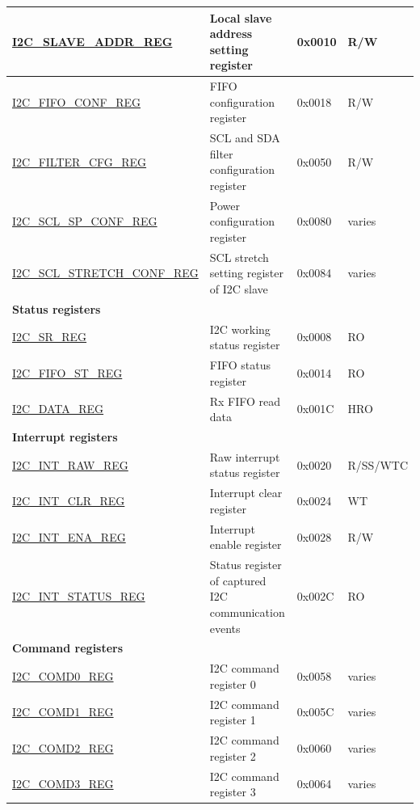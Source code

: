 \begin{longtable}{ | p{6cm} | p{7cm} | p{1.3cm} | p{1cm} | }
\hyperref[regdesc:I2CSLAVEADDRREG]{I2C\_SLAVE\_ADDR\_REG} & Local slave address setting register & 0x0010 & R/W \\ \hline
\hyperref[regdesc:I2CFIFOCONFREG]{I2C\_FIFO\_CONF\_REG} & FIFO configuration register & 0x0018 & R/W \\ \hline
\hyperref[regdesc:I2CFILTERCFGREG]{I2C\_FILTER\_CFG\_REG} & SCL and SDA filter configuration register & 0x0050 & R/W \\ \hline
\hyperref[regdesc:I2CSCLSPCONFREG]{I2C\_SCL\_SP\_CONF\_REG} & Power configuration register & 0x0080 & varies \\ \hline
\hyperref[regdesc:I2CSCLSTRETCHCONFREG]{I2C\_SCL\_STRETCH\_CONF\_REG} & SCL stretch setting register of I2C slave & 0x0084 & varies \\ \hline
\multicolumn{4}{|l|}{\textbf{Status registers}} \\ \hline
\hyperref[regdesc:I2CSRREG]{I2C\_SR\_REG} & I2C working status register & 0x0008 & RO \\ \hline
\hyperref[regdesc:I2CFIFOSTREG]{I2C\_FIFO\_ST\_REG} & FIFO status register & 0x0014 & RO \\ \hline
\hyperref[regdesc:I2CDATAREG]{I2C\_DATA\_REG} & Rx FIFO read data & 0x001C & HRO \\ \hline
\multicolumn{4}{|l|}{\textbf{Interrupt registers}} \\ \hline
\hyperref[regdesc:I2CINTRAWREG]{I2C\_INT\_RAW\_REG} & Raw interrupt status register & 0x0020 & R/SS/WTC \\ \hline
\hyperref[regdesc:I2CINTCLRREG]{I2C\_INT\_CLR\_REG} & Interrupt clear register & 0x0024 & WT \\ \hline
\hyperref[regdesc:I2CINTENAREG]{I2C\_INT\_ENA\_REG} & Interrupt enable register & 0x0028 & R/W \\ \hline
\hyperref[regdesc:I2CINTSTATUSREG]{I2C\_INT\_STATUS\_REG} & Status register of captured I2C communication events & 0x002C & RO \\ \hline
\multicolumn{4}{|l|}{\textbf{Command registers}} \\ \hline
\hyperref[regdesc:I2CCOMD0REG]{I2C\_COMD0\_REG} & I2C command register 0 & 0x0058 & varies \\ \hline
\hyperref[regdesc:I2CCOMD1REG]{I2C\_COMD1\_REG} & I2C command register 1 & 0x005C & varies \\ \hline
\hyperref[regdesc:I2CCOMD2REG]{I2C\_COMD2\_REG} & I2C command register 2 & 0x0060 & varies \\ \hline
\hyperref[regdesc:I2CCOMD3REG]{I2C\_COMD3\_REG} & I2C command register 3 & 0x0064 & varies \\ \hline

\end{longtable}
